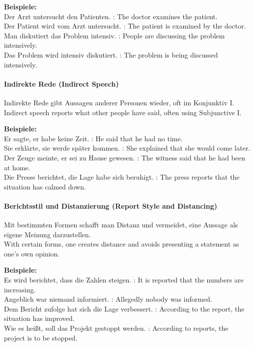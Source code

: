 \documentclass[a4paper]{article}
\begin{document}
            \textbf{Beispiele:}\\
            Der Arzt untersucht den Patienten. : The doctor examines the patient.\\
            Der Patient wird vom Arzt untersucht. : The patient is examined by the doctor.\\
            Man diskutiert das Problem intensiv. : People are discussing the problem intensively.\\
            Das Problem wird intensiv diskutiert. : The problem is being discussed intensively.
        
        \paragraph{Indirekte Rede {\small (Indirect Speech)}}
            Indirekte Rede gibt Aussagen anderer Personen wieder, oft im Konjunktiv I.\\
            Indirect speech reports what other people have said, often using Subjunctive I.
            
            \textbf{Beispiele:}\\
            Er sagte, er habe keine Zeit. : He said that he had no time.\\
            Sie erklärte, sie werde später kommen. : She explained that she would come later.\\
            Der Zeuge meinte, er sei zu Hause gewesen. : The witness said that he had been at home.\\
            Die Presse berichtet, die Lage habe sich beruhigt. : The press reports that the situation has calmed down.
        
        \paragraph{Berichtsstil und Distanzierung {\small (Report Style and Distancing)}}
            Mit bestimmten Formen schafft man Distanz und vermeidet, eine Aussage als eigene Meinung darzustellen.\\
            With certain forms, one creates distance and avoids presenting a statement as one's own opinion.
            
            \textbf{Beispiele:}\\
            Es wird berichtet, dass die Zahlen steigen. : It is reported that the numbers are increasing.\\
            Angeblich war niemand informiert. : Allegedly nobody was informed.\\
            Dem Bericht zufolge hat sich die Lage verbessert. : According to the report, the situation has improved.\\
            Wie es heißt, soll das Projekt gestoppt werden. : According to reports, the project is to be stopped.
    
\end{document}
